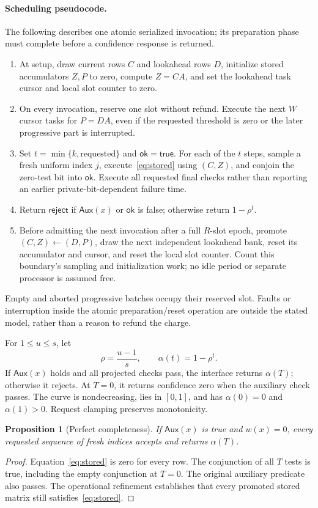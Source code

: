 \documentclass[11pt,letterpaper]{article}
\newtheorem{proposition}[theorem]{Proposition}
\theoremstyle{definition}
\newcommand{\Aux}{\mathsf{Aux}}
\newcommand{\Reject}{\mathsf{reject}}
\begin{document}
\paragraph{Scheduling pseudocode.}
The following describes one atomic serialized invocation; its preparation phase must complete before a confidence response is returned.
\begin{enumerate}[label=\arabic*.]
\item At setup, draw current rows $C$ and lookahead rows $D$, initialize stored accumulators $Z,P$ to zero, compute $Z=CA$, and set the lookahead task cursor and local slot counter to zero.
\item On every invocation, reserve one slot without refund. Execute the next $W$ cursor tasks for $P=DA$, even if the requested threshold is zero or the later progressive part is interrupted.
\item Set $t=\min\{k,\text{requested}\}$ and $\mathsf{ok}=\mathsf{true}$. For each of the $t$ steps, sample a fresh uniform index $j$, execute~\eqref{eq:stored} using $(C,Z)$, and conjoin the zero-test bit into $\mathsf{ok}$. Execute all requested final checks rather than reporting an earlier private-bit-dependent failure time.
\item Return $\Reject$ if $\Aux(x)$ or $\mathsf{ok}$ is false; otherwise return $1-\rho^t$.
\item Before admitting the next invocation after a full $R$-slot epoch, promote $(C,Z)\gets(D,P)$, draw the next independent lookahead bank, reset its accumulator and cursor, and reset the local slot counter. Count this boundary's sampling and initialization work; no idle period or separate processor is assumed free.
\end{enumerate}
Empty and aborted progressive batches occupy their reserved slot. Faults or interruption inside the atomic preparation/reset operation are outside the stated model, rather than a reason to refund the charge.

For $1\le u\le s$, let
\begin{equation}
 \rho=\frac{u-1}{s},\qquad \alpha(t)=1-\rho^t.
 \label{eq:confidence}
\end{equation}
If $\Aux(x)$ holds and all projected checks pass, the interface returns $\alpha(T)$; otherwise it rejects. At $T=0$, it returns confidence zero when the auxiliary check passes. The curve is nondecreasing, lies in $[0,1]$, and has $\alpha(0)=0$ and $\alpha(1)>0$. Request clamping preserves monotonicity.

\begin{proposition}[Perfect completeness]
If $\Aux(x)$ is true and $w(x)=0$, every requested sequence of fresh indices accepts and returns $\alpha(T)$.
\end{proposition}
\begin{proof}
Equation~\eqref{eq:stored} is zero for every row. The conjunction of all $T$ tests is true, including the empty conjunction at $T=0$. The original auxiliary predicate also passes. The operational refinement establishes that every promoted stored matrix still satisfies~\eqref{eq:stored}.
\end{proof}
\end{document}

